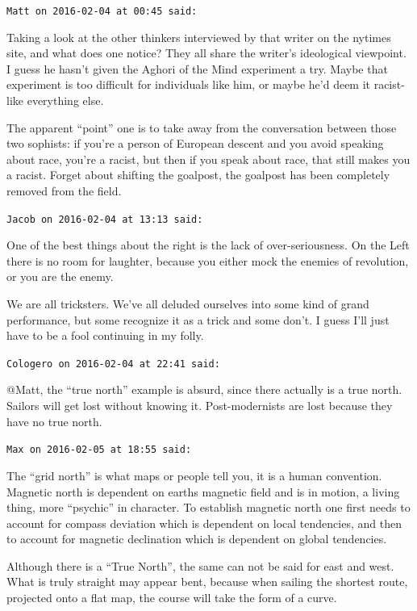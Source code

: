 \begin{footnotesize}
\begin{sffamily}
\texttt{Matt on 2016-02-04 at 00:45 said:}

Taking a look at the other thinkers interviewed by that writer on the nytimes site, and what does one notice? They all share the writer's ideological viewpoint. I guess he hasn't given the Aghori of the Mind experiment a try. Maybe that experiment is too difficult for individuals like him, or maybe he'd deem it racist- like everything else.

The apparent ``point'' one is to take away from the conversation between those two sophists: if you're a person of European descent and you avoid speaking about race, you're a racist, but then if you speak about race, that still makes you a racist. Forget about shifting the goalpost, the goalpost has been completely removed from the field.

\hfill

\texttt{Jacob on 2016-02-04 at 13:13 said:}

One of the best things about the right is the lack of over-seriousness. On the Left there is no room for laughter, because you either mock the enemies of revolution, or you are the enemy.

We are all tricksters. We've all deluded ourselves into some kind of grand performance, but some recognize it as a trick and some don't. I guess I'll just have to be a fool continuing in my folly.

\hfill

\texttt{Cologero on 2016-02-04 at 22:41 said:}

@Matt, the ``true north'' example is absurd, since there actually is a true north. Sailors will get lost without knowing it. Post-modernists are lost because they have no true north.

\hfill

\texttt{Max on 2016-02-05 at 18:55 said:}

The ``grid north'' is what maps or people tell you, it is a human convention. Magnetic north is dependent on earths magnetic field and is in motion, a living thing, more ``psychic'' in character. To establish magnetic north one first needs to account for compass deviation which is dependent on local tendencies, and then to account for magnetic declination which is dependent on global tendencies.

Although there is a ``True North'', the same can not be said for east and west. What is truly straight may appear bent, because when sailing the shortest route, projected onto a flat map, the course will take the form of a curve.


\end{sffamily}
\end{footnotesize}
